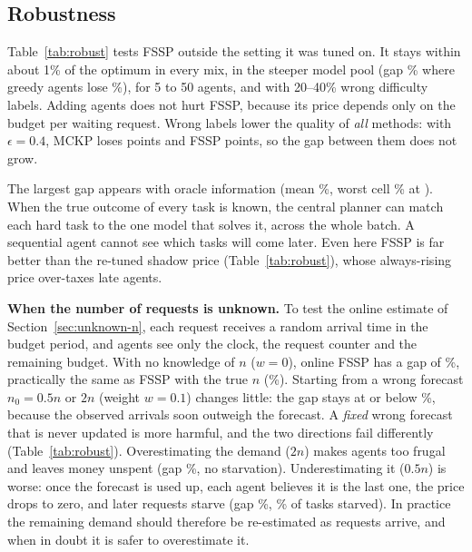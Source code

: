 \documentclass{article}
\begin{document}
\subsection{Robustness}

\begin{table}[t]
\centering
\caption{Robustness of FSSP with its single parameter setting (random arrival unless stated). Agent-count rows keep 10 tasks per agent and a budget proportional to the number of tasks; noisy-label rows replace a task's tier by a wrong one with probability $\epsilon$; the last rows replace the true $n$ by the online estimate of Section~\ref{sec:unknown-n} or by a fixed wrong forecast. ETF = easiest-first; $^*$ = re-tuned per budget.}
\label{tab:robust}
\small
\resizebox{0.92\linewidth}{!}{}
\end{table}

Table~\ref{tab:robust} tests FSSP outside the setting it was tuned on. It stays within about 1\% of the optimum in every mix, in the steeper model pool (gap \nsteepFssp\% where greedy agents lose \nsteepNaive\%), for 5 to 50 agents, and with 20--40\% wrong difficulty labels. Adding agents does not hurt FSSP, because its price depends only on the budget per waiting request. Wrong labels lower the quality of \emph{all} methods: with $\epsilon=0.4$, MCKP loses \nnoiseDropMckp{} points and FSSP \nnoiseDropFssp{} points, so the gap between them does not grow.

The largest gap appears with oracle information (mean \noracleGap\%, worst cell \noracleWorst\% at \noracleWorstWhere). When the true outcome of every task is known, the central planner can match each hard task to the one model that solves it, across the whole batch. A sequential agent cannot see which tasks will come later. Even here FSSP is far better than the re-tuned shadow price (Table~\ref{tab:robust}), whose always-rising price over-taxes late agents.

\textbf{When the number of requests is unknown.} To test the online estimate of Section~\ref{sec:unknown-n}, each request receives a random arrival time in the budget period, and agents see only the clock, the request counter and the remaining budget. With no knowledge of $n$ ($w=0$), online FSSP has a gap of \nunOnlineGap\%, practically the same as FSSP with the true $n$ (\nunKnownGap\%). Starting from a wrong forecast $n_0 = 0.5n$ or $2n$ (weight $w=0.1$) changes little: the gap stays at or below \nunOnlineMaxGap\%, because the observed arrivals soon outweigh the forecast. A \emph{fixed} wrong forecast that is never updated is more harmful, and the two directions fail differently (Table~\ref{tab:robust}). Overestimating the demand ($2n$) makes agents too frugal and leaves money unspent (gap \nunDoubleGap\%, no starvation). Underestimating it ($0.5n$) is worse: once the forecast is used up, each agent believes it is the last one, the price drops to zero, and later requests starve (gap \nunHalfGap\%, \nunHalfStarve\% of tasks starved). In practice the remaining demand should therefore be re-estimated as requests arrive, and when in doubt it is safer to overestimate it.
\end{document}
